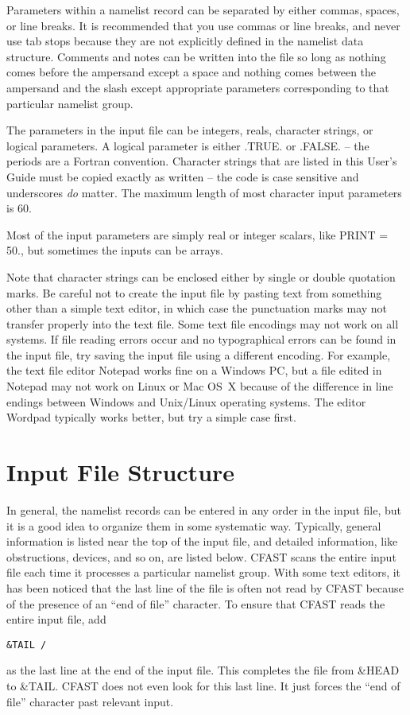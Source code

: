 Parameters within a namelist record can be separated by either commas, spaces, or line breaks. It is recommended that you use commas or line breaks, and never use tab stops because they are not explicitly defined in the namelist data structure. Comments and notes can be written into the file so long as nothing comes before the ampersand except a space and nothing comes between the ampersand and the slash except appropriate parameters corresponding to that particular namelist group.

The parameters in the input file can be integers, reals, character strings, or logical parameters. A logical parameter is either {\ct .TRUE.} or {\ct .FALSE.} -- the periods are a Fortran convention. Character strings that are listed in this User's Guide must be copied exactly as written -- the code is case sensitive and underscores {\em do} matter. The maximum length of most character input parameters is 60.

Most of the input parameters are simply real or integer scalars, like {\ct PRINT = 50.}, but sometimes the inputs can be arrays. 

Note that character strings can be enclosed either by single or double quotation marks. Be careful not to create the input file by pasting text from something other than a simple text editor, in which case the punctuation marks may not transfer properly into the text file. Some text file encodings may not work on all systems. If file reading errors occur and no typographical errors can be found in the input file, try saving the input file using a different encoding. For example, the text file editor Notepad works fine on a Windows PC, but a file edited in Notepad may not work on Linux or Mac OS~X because of the difference in line endings between Windows and Unix/Linux operating systems. The editor Wordpad typically works better, but try a simple case first.


\section{Input File Structure}

In general, the namelist records can be entered in any order in the input file, but it is a good idea to organize them in some systematic way. Typically, general information is listed near the top of the input file, and detailed information, like obstructions, devices, and so on, are listed below. CFAST scans the entire input file each time it processes a particular namelist group. With some text editors, it has been noticed that the last line of the file is often not read by CFAST because of the presence of an ``end of file'' character. To ensure that CFAST reads the entire input file, add
\begin{lstlisting}
&TAIL /
\end{lstlisting}
as the last line at the end of the input file. This completes the file from {\ct \&HEAD} to {\ct \&TAIL}. CFAST does not even look for this last line. It just forces the ``end of file'' character past relevant input.

